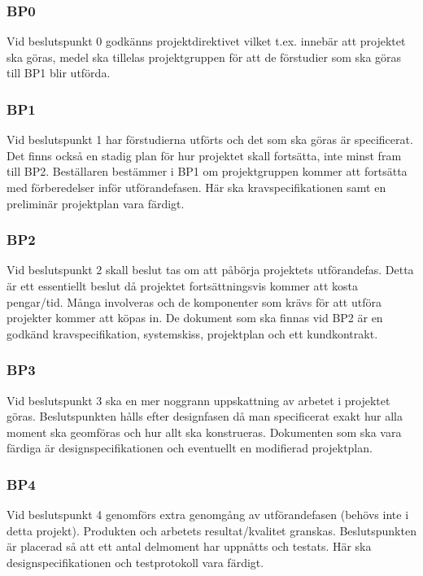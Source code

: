 \documentclass[projektplan/plan.tex]{subfiles}
\begin{document}
\subsubsection*{BP0} Vid beslutspunkt 0 godkänns projektdirektivet vilket t.ex. innebär att
projektet ska göras, medel ska tillelas projektgruppen för att de förstudier
som ska göras till  BP1 blir utförda.

\subsubsection*{BP1} 
Vid beslutspunkt 1 har förstudierna utförts och det som ska göras är specificerat. Det
finns också en stadig plan för hur projektet skall fortsätta, inte minst fram
till BP2. Beställaren bestämmer i BP1 om projektgruppen kommer att fortsätta
med förberedelser inför utförandefasen. Här ska kravspecifikationen samt en
preliminär projektplan vara färdigt.

\subsubsection*{BP2}
Vid beslutspunkt 2 skall beslut tas om att påbörja projektets utförandefas. Detta är ett
essentiellt beslut då projektet fortsättningsvis kommer att kosta pengar/tid.
Många involveras och de komponenter som krävs för att utföra projekter kommer
att köpas in. De dokument som ska finnas vid BP2 är en godkänd
kravspecifikation, systemskiss, projektplan och ett kundkontrakt.

\subsubsection*{BP3}
Vid beslutspunkt 3 ska en mer noggrann uppskattning av arbetet i projektet
göras. Beslutspunkten hålls efter designfasen då man specificerat exakt hur
alla moment ska geomföras och hur allt ska konstrueras. Dokumenten som ska vara
färdiga är designspecifikationen och eventuellt en modifierad projektplan.

\subsubsection*{BP4}
Vid beslutspunkt 4 genomförs extra genomgång av utförandefasen (behövs inte i
detta projekt). Produkten och
arbetets resultat/kvalitet granskas. Beslutspunkten är placerad så att ett
antal delmoment har uppnåtts och testats. Här ska designspecifikationen och
testprotokoll vara färdigt.
\end{document}
